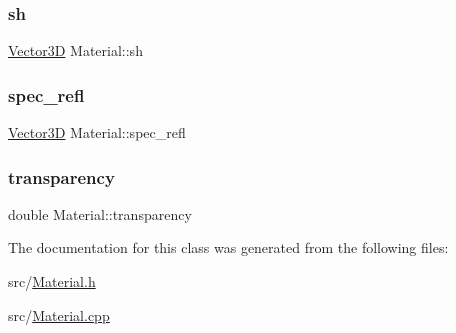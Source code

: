 \mbox{\label{classMaterial_a886d30c3aaf819eea8f619c5ecc21f92}} 
\subsubsection{\texorpdfstring{sh}{sh}}
{\footnotesize\ttfamily \mbox{\hyperlink{classVector3D}{Vector3D}} Material\+::sh\hspace{0.3cm}{\ttfamily [private]}}

\mbox{\label{classMaterial_a8b1858703e3298ba1cc705684939f953}} 
\subsubsection{\texorpdfstring{spec\_refl}{spec\_refl}}
{\footnotesize\ttfamily \mbox{\hyperlink{classVector3D}{Vector3D}} Material\+::spec\+\_\+refl\hspace{0.3cm}{\ttfamily [private]}}

\mbox{\label{classMaterial_a02abe03436775e128e04e1c737d34067}} 
\subsubsection{\texorpdfstring{transparency}{transparency}}
{\footnotesize\ttfamily double Material\+::transparency\hspace{0.3cm}{\ttfamily [private]}}



The documentation for this class was generated from the following files\+:\begin{DoxyCompactItemize}
\item 
src/\mbox{\hyperlink{Material_8h}{Material.\+h}}\item 
src/\mbox{\hyperlink{Material_8cpp}{Material.\+cpp}}\end{DoxyCompactItemize}

